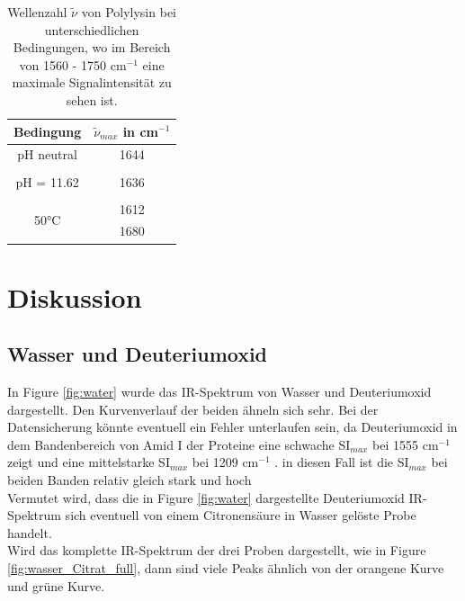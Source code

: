 \documentclass[10pt,a4paper]{article}
\begin{document}
			\begin{table}[H]
				\centering
				\caption{Wellenzahl $\tilde{\nu}$ von Polylysin bei unterschiedlichen Bedingungen, wo im Bereich von 1560 - 1750 cm$^{-1}$ eine maximale Signalintensität zu sehen ist.}
				\label{tab:Polylysin_SI}
				\begin{tabular}{cc}
					\toprule
					Bedingung & $\tilde{\nu}_{max}$ in cm$^{-1}$\\
					\midrule
					pH neutral & 1644\\
					&\\
					pH = 11.62 & 1636\\
					&\\
					\multirow{2}{*}{50°C } & 1612\\
					& 1680\\
					\bottomrule
				\end{tabular}
			\end{table}	

	
	\section{Diskussion}
		\subsection{Wasser und Deuteriumoxid}
			In Figure \ref{fig:water} wurde das IR-Spektrum von Wasser und Deuteriumoxid dargestellt. Den Kurvenverlauf der beiden ähneln sich sehr. Bei der Datensicherung könnte eventuell ein Fehler unterlaufen sein, da Deuteriumoxid in dem Bandenbereich von Amid I der Proteine eine schwache SI$_{max}$  bei 1555 cm$^{-1}$  \cite{infrared_d2o_h2o} zeigt und eine mittelstarke SI$_{max}$  bei 1209 cm$^{-1}$  \cite{infrared_d2o_h2o}. in diesen Fall ist die SI$_{max}$ bei beiden Banden relativ gleich stark und hoch\\
			Vermutet wird, dass die in Figure \ref{fig:water} dargestellte Deuteriumoxid IR-Spektrum sich eventuell von einem Citronensäure in Wasser gelöste Probe handelt.\\
			Wird das komplette IR-Spektrum der drei Proben dargestellt, wie in Figure \ref{fig:wasser_Citrat_full}, dann sind viele Peaks ähnlich von der orangene Kurve und grüne Kurve.\\
			
\end{document}
